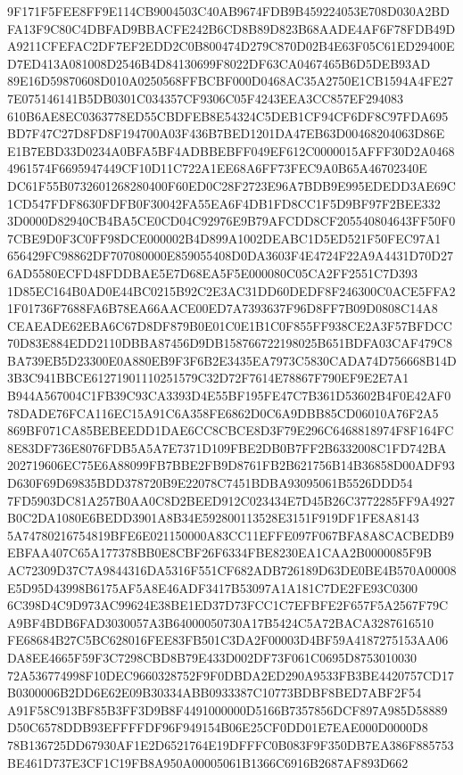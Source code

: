 \documentclass[UTF8,fontset=fandol,zihao=-4,a4paper]{ctexart}
\begin{document}
{{9F171F5FEE8FF9E114CB9004503C40AB9674FDB9B459224053E708D030A2BDFA13F9C80C4DBFAD9BBACFE242B6CD8B89D823B68AADE4AF6F78FDB49D
A9211CFEFAC2DF7EF2EDD2C0B800474D279C870D02B4E63F05C61ED29400ED7ED413A081008D2546B4D84130699F8022DF63CA0467465B6D5DEB93AD
89E16D59870608D010A0250568FFBCBF000D0468AC35A2750E1CB1594A4FE277E075146141B5DB0301C034357CF9306C05F4243EEA3CC857EF294083
610B6AE8EC0363778ED55CBDFEB8E54324C5DEB1CF94CF6DF8C97FDA695BD7F47C27D8FD8F194700A03F436B7BED1201DA47EB63D00468204063D86E
E1B7EBD33D0234A0BFA5BF4ADBBEBFF049EF612C0000015AFFF30D2A04684961574F6695947449CF10D11C722A1EE68A6FF73FEC9A0B65A46702340E
DC61F55B0732601268280400F60ED0C28F2723E96A7BDB9E995EDEDD3AE69C1CD547FDF8630FDFB0F30042FA55EA6F4DB1FD8CC1F5D9BF97F2BEE332
3D0000D82940CB4BA5CE0CD04C92976E9B79AFCDD8CF205540804643FF50F07CBE9D0F3C0FF98DCE000002B4D899A1002DEABC1D5ED521F50FEC97A1
656429FC98862DF707080000E859055408D0DA3603F4E4724F22A9A4431D70D276AD5580ECFD48FDDBAE5E7D68EA5F5E000080C05CA2FF2551C7D393
1D85EC164B0AD0E44BC0215B92C2E3AC31DD60DEDF8F246300C0ACE5FFA21F01736F7688FA6B78EA66AACE00ED7A7393637F96D8FF7B09D0808C14A8
CEAEADE62EBA6C67D8DF879B0E01C0E1B1C0F855FF938CE2A3F57BFDCC70D83E884EDD2110DBBA87456D9DB158766722198025B651BDFA03CAF479C8
BA739EB5D23300E0A880EB9F3F6B2E3435EA7973C5830CADA74D756668B14D3B3C941BBCE61271901110251579C32D72F7614E78867F790EF9E2E7A1
B944A567004C1FB39C93CA3393D4E55BF195FE47C7B361D53602B4F0E42AF078DADE76FCA116EC15A91C6A358FE6862D0C6A9DBB85CD06010A76F2A5
869BF071CA85BEBEEDD1DAE6CC8CBCE8D3F79E296C6468818974F8F164FC8E83DF736E8076FDB5A5A7E7371D109FBE2DB0B7FF2B6332008C1FD742BA
202719606EC75E6A88099FB7BBE2FB9D8761FB2B621756B14B36858D00ADF93D630F69D69835BDD378720B9E22078C7451BDBA93095061B5526DDD54
7FD5903DC81A257B0AA0C8D2BEED912C023434E7D45B26C3772285FF9A4927B0C2DA1080E6BEDD3901A8B34E592800113528E3151F919DF1FE8A8143
5A74780216754819BFE6E021150000A83CC11EFFE097F067BFA8A8CACBEDB9EBFAA407C65A177378BB0E8CBF26F6334FBE8230EA1CAA2B0000085F9B
AC72309D37C7A9844316DA5316F551CF682ADB726189D63DE0BE4B570A00008E5D95D43998B6175AF5A8E46ADF3417B53097A1A181C7DE2FE93C0300
6C398D4C9D973AC99624E38BE1ED37D73FCC1C7EFBFE2F657F5A2567F79CA9BF4BDB6FAD3030057A3B64000050730A17B5424C5A72BACA3287616510
FE68684B27C5BC628016FEE83FB501C3DA2F00003D4BF59A4187275153AA06DA8EE4665F59F3C7298CBD8B79E433D002DF73F061C0695D8753010030
72A536774998F10DEC9660328752F9F0DBDA2ED290A9533FB3BE4420757CD17B0300006B2DD6E62E09B30334ABB0933387C10773BDBF8BED7ABF2F54
A91F58C913BF85B3FF3D9B8F4491000000D5166B7357856DCF897A985D58889D50C6578DDB93EFFFFDF96F949154B06E25CF0DD01E7EAE000D0000D8
78B136725DD67930AF1E2D6521764E19DFFFC0B083F9F350DB7EA386F885753BE461D737E3CF1C19FB8A950A00005061B1366C6916B2687AF893D662
}}
\end{document}
